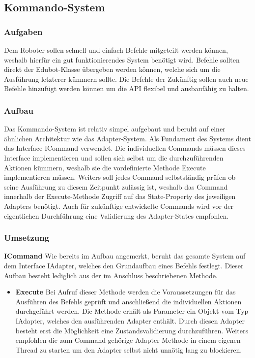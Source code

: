 
\subsection{Kommando-System}

\subsubsection{Aufgaben}
Dem Roboter sollen schnell und einfach Befehle mitgeteilt werden können, weshalb hierfür ein gut funktionierendes System benötigt wird. Befehle sollten direkt der Edubot-Klasse übergeben werden können, welche sich um die Ausführung letzterer kümmern sollte. Die Befehle der  Zukünftig sollen auch neue Befehle hinzufügt werden können um die API flexibel und ausbaufähig zu halten.

\subsubsection{Aufbau}
Das Kommando-System ist relativ simpel aufgebaut und beruht auf einer ähnlichen Architektur wie das Adapter-System. Als Fundament des Systems dient das Interface ICommand verwendet. Die individuellen Commands müssen dieses Interface implementieren und sollen sich selbst um die durchzuführenden Aktionen kümmern, weshalb sie die vordefinierte Methode Execute implementieren müssen. Weiters soll jedes Command selbstständig prüfen ob seine Ausführung zu diesem Zeitpunkt zulässig ist, weshalb das Command innerhalb der Execute-Methode Zugriff auf das State-Property des jeweiligen Adapters benötigt. Auch für zukünftige entwickelte Commands wird vor der eigentlichen Durchführung eine Validierung des Adapter-States empfohlen.

\subsubsection{Umsetzung}
\textbf{ICommand}
\newline
Wie bereits im Aufbau angemerkt, beruht das gesamte System auf dem Interface IAdapter, welches den Grundaufbau eines Befehls festlegt. Dieser Aufbau besteht lediglich aus der im Anschluss beschriebenen Methode.
\begin{itemize}
\item \textbf{Execute}
\newline
Bei Aufruf dieser Methode werden die Voraussetzungen für das Ausführen des Befehls geprüft und anschließend die individuellen Aktionen durchgeführt werden. Die Methode erhält als Parameter ein Objekt vom Typ IAdapter, welches den ausführenden Adapter enthält. Durch diesen Adapter besteht erst die Möglichkeit eine Zustandsvalidierung durchzuführen. Weiters empfohlen die zum Command gehörige Adapter-Methode in einem eigenen Thread zu starten um den Adapter selbst nicht unnötig lang zu blockieren.
\end{itemize}

